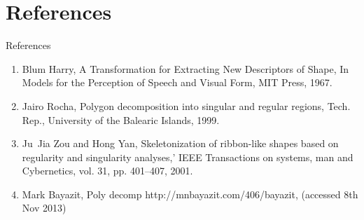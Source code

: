 \section{References}
\begin{frame}{References}
\begin{enumerate}
\item Blum Harry, A Transformation for Extracting New Descriptors of Shape, In Models for the Perception of Speech and Visual Form, MIT Press, 1967.
\item Jairo Rocha, Polygon decomposition into singular and regular regions, Tech. Rep., University of the Balearic Islands, 1999.
\item Ju~Jia Zou and Hong Yan, Skeletonization of ribbon-like shapes based on regularity and singularity analyses,' IEEE Transactions on systems, man and Cybernetics, vol. 31, pp. 401--407, 2001.
\item Mark Bayazit, Poly decomp http://mnbayazit.com/406/bayazit, (accessed 8th Nov 2013)
\end{enumerate}


\end{frame}